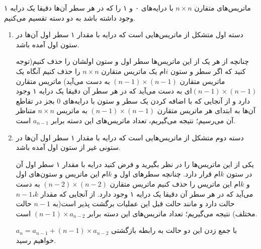 \p
    ماتریس‌های متقارن $n\times n$ با درایه‌های ۰ و ۱ را که در هر سطر آن‌ها دقیقا یک درایه ۱ وجود داشته باشد به دو دسته تقسیم می‌کنیم.

    \begin{enumerate}
        \item
        
        دسته اول متشکل از ماتریس‌هایی است که درایه با مقدار ۱ سطر اول آن‌ها در ستون اول آمده باشد.
        
        چنانچه از هر یک از این ماتریس‌ها سطر اول و ستون اولشان را حذف کنیم(توجه کنید که اگر سطر و ستون $i$ام یک ماتریس متقارن $n\times n$ را حذف کنیم آنگاه یک ماتریس متقارن $(n-1)\times(n-1)$ به دست می‌آید) ماتریس متقارن $(n-1)\times(n-1)$ای به دست می‌آید که در هر سطر آن دقیقا یک درایه ۱ وجود دارد و از آنجایی که با اضافه کردن یک سطر و ستون با درایه‌های 0 بجز در تقاطع آن‌ها به ابتدای هر ماتریس متقارن $(n-1)\times(n-1)$ به ماتریس $n\times n$ متناظر آن می‌رسیم؛ نتیجه می‌گیریم، تعداد ماتریس‌های این دسته برابر $a_{n-1}$ است.
        \item
        
        دسته دوم متشکل از ماتریس‌هایی است که درایه با مقدار ۱ سطر اول آن‌ها در ستونی غیر از ستون اول آمده باشد.
        
        یکی از این ماتریس‌ها را در نظر بگیرید و فرض کنید درایه با مقدار ۱ سطر اول آن در ستون $k$ام قرار دارد. چنانچه سطر‌های اول و $k$ام این ماتریس و ستون‌های اول و $k$ام این ماتریس ‌را حذف کنیم ماتریس متقارن $(n-2)\times(n-2)$ به دست می‌آید که در هر سطر آن دقیقا یک درایه ۱ وجود دارد. از آنجایی که مقدار $k$،$n-1$ حالت دارد و مانند حالت قبل این عملیات برگشت پذیر است(به $n-1$ حالت مختلف) نتیجه می‌گیریم؛ تعداد ماتریس‌های این دسته برابر $(n-1)\times a_{n-2}$ است.
        
        با جمع زدن این دو حالت به رابطه بازگشتی $a_n=a_{n-1}+(n-1)\times a_{n-2}$ خواهیم رسید.
    \end{enumerate}
